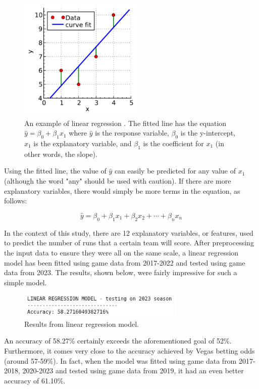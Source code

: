 \documentclass{paper}
\begin{document}
\begin{figure}[H]
  \centering
  \includegraphics[width=6cm]{fig12}
  \caption{An example of linear regression \cite{linreg}. The fitted line has the equation $\hat{y}=\beta_0+\beta_1x_1$ where $\hat{y}$ is the response variable, $\beta_0$ is the y-intercept, $x_1$ is the explanatory variable, and $\beta_1$ is the coefficient for $x_1$ (in other words, the slope).}
\end{figure}

Using the fitted line, the value of $\hat{y}$ can easily be predicted for any value of $x_1$ (although the word "any" should be used with caution). If there are more explanatory variables, there would simply be more terms in the equation, as follows:

$$\hat{y}=\beta_0+\beta_1x_1+\beta_2x_2+\cdots+\beta_nx_n$$

In the context of this study, there are 12 explanatory variables, or features, used to predict the number of runs that a certain team will score. After preprocessing the input data to ensure they were all on the same scale, a linear regression model has been fitted using game data from 2017-2022 and tested using game data from 2023. The results, shown below, were fairly impressive for such a simple model.

\begin{figure}[H]
  \centering
  \includegraphics[width=8cm]{fig2}
  \caption{Results from linear regression model.}
\end{figure}

An accuracy of 58.27\% certainly exceeds the aforementioned goal of 52\%. Furthermore, it comes very close to the accuracy achieved by Vegas betting odds (around 57-59\%). In fact, when the model was fitted using game data from 2017-2018, 2020-2023 and tested using game data from 2019, it had an even better accuracy of 61.10\%.
\end{document}
